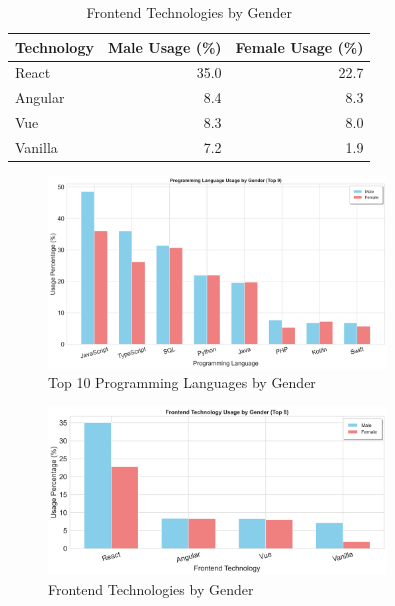 \documentclass[12pt,a4paper]{article}
\begin{document}
\begin{table}[H]
	\centering
	\small
	\begin{tabular}{lrr}
		\toprule
		\textbf{Technology} & \textbf{Male Usage (\%)} & \textbf{Female Usage (\%)} \\
		\midrule
		React               & 35.0                     & 22.7                       \\
		Angular             & 8.4                      & 8.3                        \\
		Vue                 & 8.3                      & 8.0                        \\
		Vanilla             & 7.2                      & 1.9                        \\
		\bottomrule
	\end{tabular}
	\caption{Frontend Technologies by Gender}
\end{table}

\begin{figure}[H]
	\centering
	\includegraphics[width=0.8\textwidth]{figures/barplot_gender_programming.png}
	\caption{Top 10 Programming Languages by Gender}
\end{figure}

\begin{figure}[H]
	\centering
	\includegraphics[width=0.8\textwidth]{figures/barplot_gender_frontend.png}
	\caption{Frontend Technologies by Gender}
\end{figure}
\end{document}
